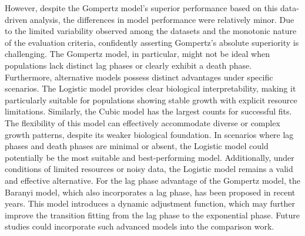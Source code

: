 \documentclass{article}
\begin{document}
However, despite the Gompertz model's superior performance based on this data-driven analysis, the differences in model performance were relatively minor. Due to the limited variability observed among the datasets and the monotonic nature of the evaluation criteria, confidently asserting Gompertz’s absolute superiority is challenging. The Gompertz model, in particular, might not be ideal when populations lack distinct lag phases or clearly exhibit a death phase. \cite{peleg2011microbial} Furthermore, alternative models possess distinct advantages under specific scenarios. The Logistic model provides clear biological interpretability, making it particularly suitable for populations showing stable growth with explicit resource limitations. Similarly, the Cubic model has the largest counts for successful fits. The flexibility of this model can effectively accommodate diverse or complex growth patterns, despite its weaker biological foundation.
In scenarios where lag phases and death phases are minimal or absent, the Logistic model could potentially be the most suitable and best-performing model. Additionally, under conditions of limited resources or noisy data, the Logistic model remains a valid and effective alternative.
For the lag phase advantage of the Gompertz model, the Baranyi model,\cite{baranyi1994dynamic} which also incorporates a lag phase, has been proposed in recent years. This model introduces a dynamic adjustment function, which may further improve the transition fitting from the lag phase to the exponential phase. Future studies could incorporate such advanced models into the comparison work.
\end{document}
